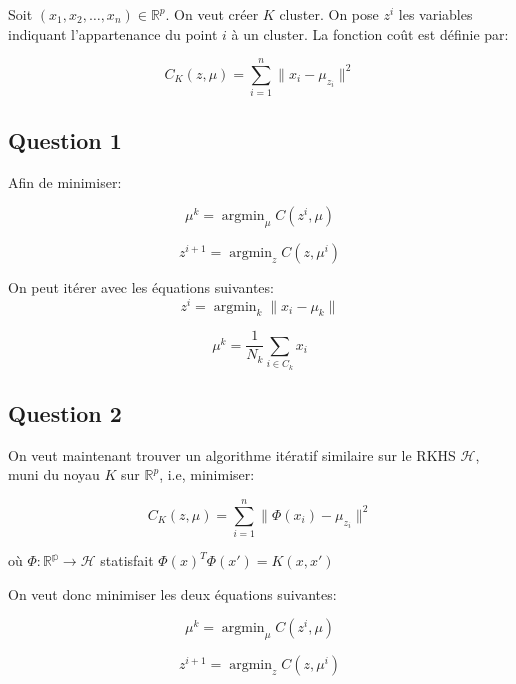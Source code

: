 \documentclass{article}
\DeclareMathOperator{\argmin}{argmin}
\begin{document}
Soit $(x_1, x_2, \dots, x_n) \in \mathbb{R}^p$. On veut créer $K$ cluster. On
pose $z^i$ les variables indiquant l'appartenance du point $i$ à un cluster.
La fonction coût est définie par:

\begin{equation*}
C_K(z, \mu) = \sum_{i = 1}^n \| x_i - \mu_{z_i}\|^2
\end{equation*}


\subsection{Question 1}

Afin de minimiser:

\begin{equation*}
\mu^k = \argmin_{\mu} C(z^i, \mu)
\end{equation*}

\begin{equation*}
z^{i + 1} = \argmin_z C(z, \mu^i)
\end{equation*}

On peut itérer avec les équations suivantes:
\begin{equation*}
z^i = \argmin_k \| x_i - \mu_k\|
\end{equation*}

\begin{equation*}
\mu^k = \frac{1}{N_k} \sum_{i \in C_k}x_i
\end{equation*}

\subsection{Question 2}
On veut maintenant trouver un algorithme itératif similaire sur le RKHS
$\mathcal{H}$, muni du noyau $K$ sur $\mathbb{R}^p$, i.e, minimiser:

\begin{equation*}
C_K(z, \mu) = \sum_{i = 1}^n \| \Phi(x_i) - \mu_{z_i}\|^2
\end{equation*}

où $\Phi : \mathbb{R^p} \rightarrow \mathcal{H}$ statisfait $\Phi(x)^T \Phi(x')
= K(x, x')$

On veut donc minimiser les deux équations suivantes:

\begin{equation*}
\mu^k = \argmin_{\mu} C(z^i, \mu)
\end{equation*}

\begin{equation*}
z^{i + 1} = \argmin_z C(z, \mu^i)
\end{equation*}
\end{document}
